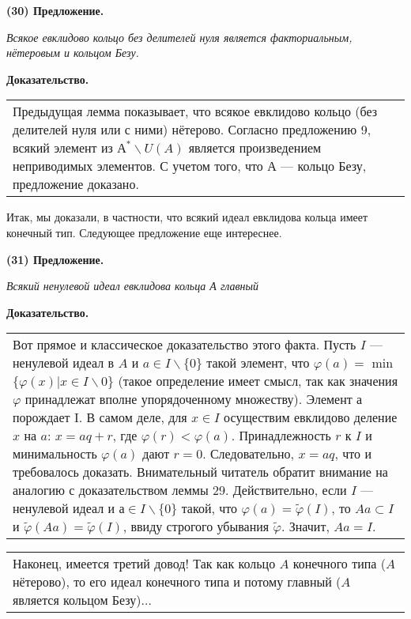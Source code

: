 \documentclass{mai_book}
\begin{document}
\noindent \textbf{(30) Предложение.}

\textit{Всякое евклидово кольцо без делителей нуля является факториальным, нётеровым и кольцом Безу.}

\noindent\textbf{Доказательство.}\newline
\begin{tabular}{|p{13.5cm}}
Предыдущая лемма показывает, что всякое евклидово кольцо (без делителей нуля или с ними) нётерово. Согласно предложению 9, всякий элемент из $А^* \backslash U(A)$ является произведением неприводимых элементов. С учетом того, что $А$ — кольцо Безу, предложение доказано.
\end{tabular}\newline\newline

Итак, мы доказали, в частности, что всякий идеал евклидова кольца имеет конечный тип. Следующее предложение еще интереснее.

\noindent\textbf{(31) Предложение.}

\textit{Всякий ненулевой идеал евклидова кольца А главный}

\noindent\textbf{Доказательство.}\newline
\begin{tabular}{|p{13.5cm}}
Вот прямое и классическое доказательство этого факта. Пусть 
$I$ — ненулевой идеал в $A$ и $a \in I \backslash \{0\}$ такой элемент, что 
$\varphi(a) =$ min$\{\varphi(x) | x \in I \backslash 0\}$ (такое определение имеет смысл, так 
как значения $\varphi$ принадлежат вполне упорядоченному множеству). 
Элемент $а$ порождает I. В самом деле, для $x \in I$ осуществим  
евклидово деление $x$ на $a$: $x = aq + r$, где $\varphi(r) < \varphi(a)$. Принадлежность $r$ 
к $I$ и минимальность $\varphi(a)$ дают $r = 0$. Следовательно, $x = aq$, что 
и требовалось доказать.\newline 
Внимательный читатель обратит внимание на аналогию с  
доказательством леммы 29. Действительно, если $I$ — ненулевой идеал и 
$ а \in I\backslash \{0\}$ такой, что $\varphi(a) = \tilde{\varphi}(I)$, то $Aa \subset I$ и $\tilde{\varphi}(Aa) = \tilde{\varphi}(I)$, ввиду 
 строгого убывания $\tilde{\varphi}$. Значит, $Aa = I$.
\end{tabular}
\pagebreak

\noindent\begin{tabular}{|p{13.5cm}}
Наконец, имеется третий довод! Так как кольцо $A$ конечного  
типа ($A$ нётерово), то его идеал конечного типа и потому главный 
($A$ является кольцом Безу)... 
\end{tabular}
\end{document}
